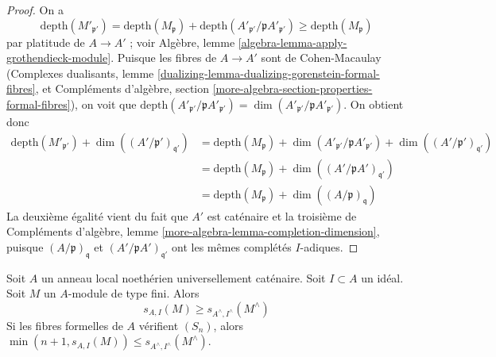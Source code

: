 \begin{proof}
On a
$$
\text{depth}(M'_{\mathfrak p'}) =
\text{depth}(M_\mathfrak p) +
\text{depth}(A'_{\mathfrak p'}/\mathfrak p A'_{\mathfrak p'})
\geq \text{depth}(M_\mathfrak p)
$$
par platitude de $A \to A'$ ; voir Algèbre, lemme \ref{algebra-lemma-apply-grothendieck-module}. Puisque les fibres de $A \to A'$ sont de Cohen-Macaulay (Complexes dualisants, lemme \ref{dualizing-lemma-dualizing-gorenstein-formal-fibres}, et Compléments d'algèbre, section \ref{more-algebra-section-properties-formal-fibres}), on voit que $\text{depth}(A'_{\mathfrak p'}/\mathfrak p A'_{\mathfrak p'}) =
\dim(A'_{\mathfrak p'}/\mathfrak p A'_{\mathfrak p'})$. On obtient donc
\begin{align*}
\text{depth}(M'_{\mathfrak p'}) +
\dim((A'/\mathfrak p')_{\mathfrak q'})
& =
\text{depth}(M_\mathfrak p) +
\dim(A'_{\mathfrak p'}/\mathfrak p A'_{\mathfrak p'}) +
\dim((A'/\mathfrak p')_{\mathfrak q'}) \\
& =
\text{depth}(M_\mathfrak p) +
\dim((A'/\mathfrak p A')_{\mathfrak q'}) \\
& =
\text{depth}(M_\mathfrak p) +
\dim((A/\mathfrak p)_\mathfrak q)
\end{align*}
La deuxième égalité vient du fait que $A'$ est caténaire et la troisième de Compléments d'algèbre, lemme \ref{more-algebra-lemma-completion-dimension}, puisque $(A/\mathfrak p)_\mathfrak q$ et $(A'/\mathfrak p A')_{\mathfrak q'}$ ont les mêmes complétés $I$-adiques.
\end{proof}





\begin{lemma}
\label{lemma-cutoff-completion}
Soit $A$ un anneau local noethérien universellement caténaire. Soit $I \subset A$ un idéal. Soit $M$ un $A$-module de type fini. Alors
$$
s_{A, I}(M) \geq s_{A^\wedge, I^\wedge}(M^\wedge)
$$
Si les fibres formelles de $A$ vérifient $(S_n)$, alors $\min(n + 1, s_{A, I}(M)) \leq s_{A^\wedge, I^\wedge}(M^\wedge)$.
\end{lemma}

